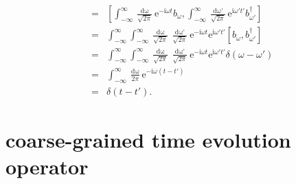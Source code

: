 \documentclass[%
 onecolumn,
 notitlepage,
 longbibliography,
 amsmath,amssymb,
 aps,
 pra,
 10pt,
]{revtex4-1}
\begin{document}
\begin{eqnarray}
[b(t), b^\dagger(t')]&=&\left[\int_{-\infty}^{\infty} \frac{\mathop{\textrm{d}\omega}}{\sqrt{2\pi}}\textrm{e}^{-\textrm{i}\omega t} b_\omega,\int_{-\infty}^{\infty} \frac{\mathop{\textrm{d}\omega'}}{\sqrt{2\pi}}\textrm{e}^{\textrm{i}\omega' t'} b_{\omega'}^\dagger\right]\\
&=&\int_{-\infty}^{\infty} \int_{-\infty}^{\infty}\frac{\mathop{\textrm{d}\omega}}{\sqrt{2\pi}} \frac{\mathop{\textrm{d}\omega'}}{\sqrt{2\pi}}\textrm{e}^{-\textrm{i}\omega t}\textrm{e}^{\textrm{i}\omega' t'}\left[ b_\omega, b_{\omega'}^\dagger\right]\\
&=&\int_{-\infty}^{\infty} \int_{-\infty}^{\infty}\frac{\mathop{\textrm{d}\omega}}{\sqrt{2\pi}} \frac{\mathop{\textrm{d}\omega'}}{\sqrt{2\pi}}\textrm{e}^{-\textrm{i}\omega t}\textrm{e}^{\textrm{i}\omega' t'}\delta(\omega-\omega')\\
&=&\int_{-\infty}^{\infty} \frac{\mathop{\textrm{d}\omega}}{2\pi} \textrm{e}^{-\textrm{i}\omega (t-t')}\\
&=&\delta(t-t').
\end{eqnarray}


\section{coarse-grained time evolution operator}
\end{document}
